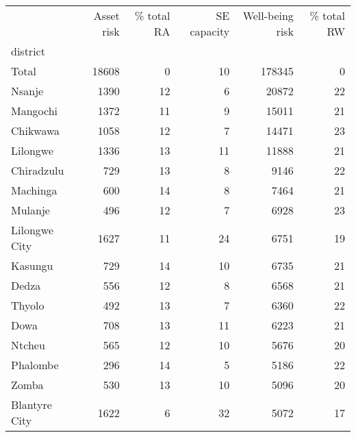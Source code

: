 \begin{tabular}{lrrrrr}
\toprule
{} &  Asset risk &  \% total RA &  SE capacity &  Well-being risk &  \% total RW \\
district      &             &             &              &                  &             \\
\midrule
Total         &       18608 &           0 &           10 &           178345 &           0 \\
Nsanje        &        1390 &          12 &            6 &            20872 &          22 \\
Mangochi      &        1372 &          11 &            9 &            15011 &          21 \\
Chikwawa      &        1058 &          12 &            7 &            14471 &          23 \\
Lilongwe      &        1336 &          13 &           11 &            11888 &          21 \\
Chiradzulu    &         729 &          13 &            8 &             9146 &          22 \\
Machinga      &         600 &          14 &            8 &             7464 &          21 \\
Mulanje       &         496 &          12 &            7 &             6928 &          23 \\
Lilongwe City &        1627 &          11 &           24 &             6751 &          19 \\
Kasungu       &         729 &          14 &           10 &             6735 &          21 \\
Dedza         &         556 &          12 &            8 &             6568 &          21 \\
Thyolo        &         492 &          13 &            7 &             6360 &          22 \\
Dowa          &         708 &          13 &           11 &             6223 &          21 \\
Ntcheu        &         565 &          12 &           10 &             5676 &          20 \\
Phalombe      &         296 &          14 &            5 &             5186 &          22 \\
Zomba         &         530 &          13 &           10 &             5096 &          20 \\
Blantyre City &        1622 &           6 &           32 &             5072 &          17 \\

\end{tabular}
